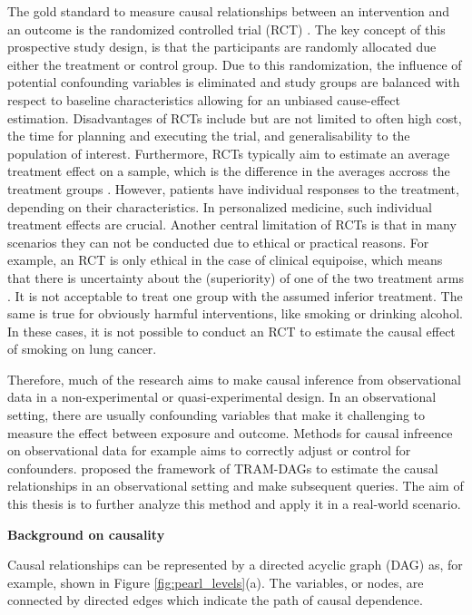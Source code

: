 The gold standard to measure causal relationships between an intervention and an outcome is the randomized controlled trial (RCT) \citep{hariton2018}. The key concept of this prospective study design, is that the participants are randomly allocated due either the treatment or control group. Due to this randomization, the influence of potential confounding variables is eliminated and study groups are balanced with respect to baseline characteristics allowing for an unbiased cause-effect estimation.
Disadvantages of RCTs include but are not limited to often high cost, the time for planning and executing the trial, and generalisability to the population of interest. %
Furthermore, RCTs typically aim to estimate an average treatment effect on a sample, which is the difference in the averages accross the treatment groups \citep{nichols2007}. However, patients have individual responses to the treatment, depending on their characteristics. In personalized medicine, such individual treatment effects are crucial.
Another central limitation of RCTs is that in many scenarios they can not be conducted due to ethical or practical reasons. For example, an RCT is only ethical in the case of clinical equipoise, which means that there is uncertainty about the (superiority) of one of the two treatment arms \citep{freedman1987}. It is not acceptable to treat one group with the assumed inferior treatment. The same is true for obviously harmful interventions, like smoking or drinking alcohol. In these cases, it is not possible to conduct an RCT to estimate the causal effect of smoking on lung cancer.

Therefore, much of the research aims to make causal inference from observational data in a non-experimental or quasi-experimental design. In an observational setting, there are usually confounding variables that make it challenging to measure the effect between exposure and outcome. Methods for causal infreence on observational data for example aims to correctly adjust or control for confounders. \citet{sick2025} proposed the framework of TRAM-DAGs to estimate the causal relationships in an observational setting and make subsequent queries. The aim of this thesis is to further analyze this method and apply it in a real-world scenario.


\textbf{Background on causality}

Causal relationships can be represented by a directed acyclic graph (DAG) as, for example, shown in Figure \ref{fig:pearl_levels}(a). The variables, or nodes, are connected by directed edges which indicate the path of causal dependence.

